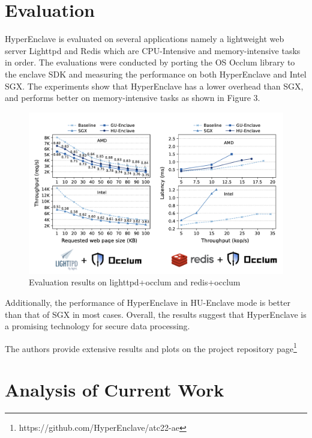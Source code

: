 \section{Evaluation}
HyperEnclave is evaluated on several applications namely a lightweight web server Lighttpd and Redis which are CPU-Intensive and memory-intensive tasks in order. The evaluations were conducted by porting the OS Occlum library to the enclave SDK and measuring the performance on both HyperEnclave and Intel SGX. The experiments show that HyperEnclave has a lower overhead than SGX, and performs better on memory-intensive tasks as shown in Figure 3.

\begin{figure}[H]
    \centerline{\includegraphics[scale=.29]{figures/evaluation.png}}
    \caption{Evaluation results on lighttpd+occlum and redis+occlum}
    \label{fig}
\end{figure}

\noindent
 Additionally, the performance of HyperEnclave in HU-Enclave mode is better than that of SGX in most cases. Overall, the results suggest that HyperEnclave is a promising technology for secure data processing.

\noindent
The authors provide extensive results and plots on the project repository page\footnote{https://github.com/HyperEnclave/atc22-ae}



\section{Analysis of Current Work}

